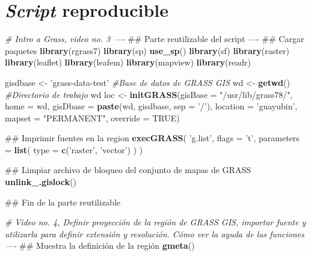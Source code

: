 \documentclass[11pt,]{article}
\newenvironment{Shaded}{\begin{snugshade}}{\end{snugshade}}
\newcommand{\KeywordTok}[1]{\textcolor[rgb]{0.13,0.29,0.53}{\textbf{#1}}}
\newcommand{\DataTypeTok}[1]{\textcolor[rgb]{0.13,0.29,0.53}{#1}}
\newcommand{\StringTok}[1]{\textcolor[rgb]{0.31,0.60,0.02}{#1}}
\newcommand{\CommentTok}[1]{\textcolor[rgb]{0.56,0.35,0.01}{\textit{#1}}}
\newcommand{\OtherTok}[1]{\textcolor[rgb]{0.56,0.35,0.01}{#1}}
\newcommand{\NormalTok}[1]{#1}
\begin{document}
\section{\texorpdfstring{\emph{Script}
reproducible}{Script reproducible}}\label{script-reproducible}

\begin{Shaded}
\begin{Highlighting}[]
\CommentTok{# Intro a Grass, video no. 3 ----}
\NormalTok{## Parte reutilizable del script ----}
\NormalTok{## Cargar paquetes}
\KeywordTok{library}\NormalTok{(rgrass7)}
\KeywordTok{library}\NormalTok{(sp)}
\KeywordTok{use_sp}\NormalTok{()}
\KeywordTok{library}\NormalTok{(sf)}
\KeywordTok{library}\NormalTok{(raster)}
\KeywordTok{library}\NormalTok{(leaflet)}
\KeywordTok{library}\NormalTok{(leafem)}
\KeywordTok{library}\NormalTok{(mapview)}
\KeywordTok{library}\NormalTok{(readr)}

\NormalTok{gisdbase <-}\StringTok{ 'grass-data-test'} \CommentTok{#Base de datos de GRASS GIS}
\NormalTok{wd <-}\StringTok{ }\KeywordTok{getwd}\NormalTok{() }\CommentTok{#Directorio de trabajo}
\NormalTok{wd}
\NormalTok{loc <-}\StringTok{ }\KeywordTok{initGRASS}\NormalTok{(}\DataTypeTok{gisBase =} \StringTok{"/usr/lib/grass78/"}\NormalTok{,}
                 \DataTypeTok{home =}\NormalTok{ wd,}
                 \DataTypeTok{gisDbase =} \KeywordTok{paste}\NormalTok{(wd, gisdbase, }\DataTypeTok{sep =} \StringTok{'/'}\NormalTok{),}
                 \DataTypeTok{location =} \StringTok{'guayubin'}\NormalTok{,}
                 \DataTypeTok{mapset =} \StringTok{"PERMANENT"}\NormalTok{,}
                 \DataTypeTok{override =} \OtherTok{TRUE}\NormalTok{)}

\NormalTok{## Imprimir fuentes en la region}
\KeywordTok{execGRASS}\NormalTok{(}
  \StringTok{'g.list'}\NormalTok{,}
  \DataTypeTok{flags =} \StringTok{'t'}\NormalTok{,}
  \DataTypeTok{parameters =} \KeywordTok{list}\NormalTok{(}
    \DataTypeTok{type =} \KeywordTok{c}\NormalTok{(}\StringTok{'raster'}\NormalTok{, }\StringTok{'vector'}\NormalTok{)}
\NormalTok{  )}
\NormalTok{)}

\NormalTok{## Limpiar archivo de bloqueo del conjunto de mapas de GRASS}
\KeywordTok{unlink_.gislock}\NormalTok{()}

\NormalTok{## Fin de la parte reutilizable}

\CommentTok{# Video no. 4, Definir proyección de la región de GRASS GIS, importar fuente y utilizarla para definir extensión y resolución. Cómo ver la ayuda de las funciones ----}
\NormalTok{## Muestra la definición de la región}
\KeywordTok{gmeta}\NormalTok{()}


\end{Highlighting}
\end{Shaded}
\end{document}
